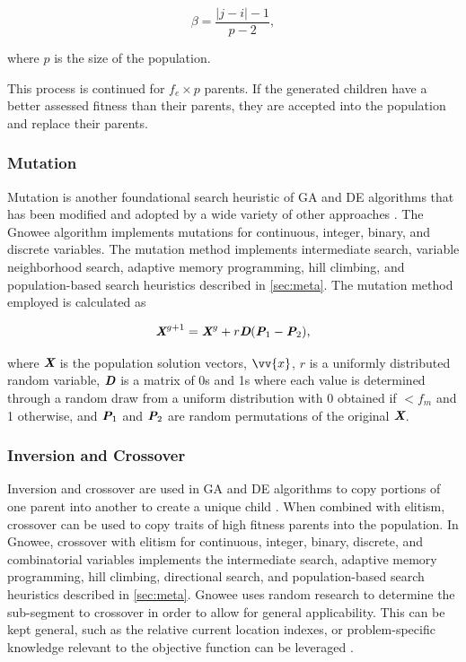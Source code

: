 \documentclass{article}                                                                           %
\begin{document}
\begin{equation}
  \beta = \frac{|j-i|-1}{p-2},
\end{equation}

\noindent where $p$ is the size of the population.

This process is continued for $f_e \times p$ parents.
If the generated children have a better assessed fitness than their parents, they are accepted into the population and replace their parents.

\subsubsection{Mutation}
Mutation is another foundational search heuristic of GA and DE algorithms that has been modified and adopted by a wide variety of other approaches \cite{Storn1997, Yang2014, Back1993}.  
The Gnowee algorithm implements mutations for continuous, integer, binary, and discrete variables.
The mutation method implements intermediate search, variable neighborhood search, adaptive memory programming, hill climbing, and population-based search heuristics described in \autoref{sec:meta}. 
The mutation method employed is calculated as 

\begin{equation}
  \textit{\textbf{X}}^{g+1}=\textit{\textbf{X}}^g+r \textit{\textbf{D}} (\textit{\textbf{P}}_1-\textit{\textbf{P}}_2),
\end{equation}

\noindent where $\textit{\textbf{X}}$ is the population solution vectors, $\vv{x}$, $r$ is a uniformly distributed random variable, $\textit{\textbf{D}}$ is a matrix of 0s and 1s where each value is determined through a random draw from a uniform distribution with 0 obtained if $<f_m$ and 1 otherwise, and $\textit{\textbf{P}}_1$ and $\textit{\textbf{P}}_2$ are random permutations of the original $\textit{\textbf{X}}$. 

\subsubsection{Inversion and Crossover}
Inversion and crossover are used in GA and DE algorithms to copy portions of one parent into another to create a unique child \cite{Storn1997, Tao1998, Back1993}. 
When combined with elitism, crossover can be used to copy traits of high fitness parents into the population.   
In Gnowee, crossover with elitism for continuous, integer, binary,  discrete, and combinatorial variables implements the intermediate search, adaptive memory programming, hill climbing, directional search, and population-based search heuristics described in \autoref{sec:meta}.
Gnowee uses random research to determine the sub-segment to crossover in order to allow for general applicability.  
This can be kept general, such as the relative current location indexes, or problem-specific knowledge relevant to the objective function can be leveraged \cite{Tao1998, Zhou2014}. 
\end{document}
